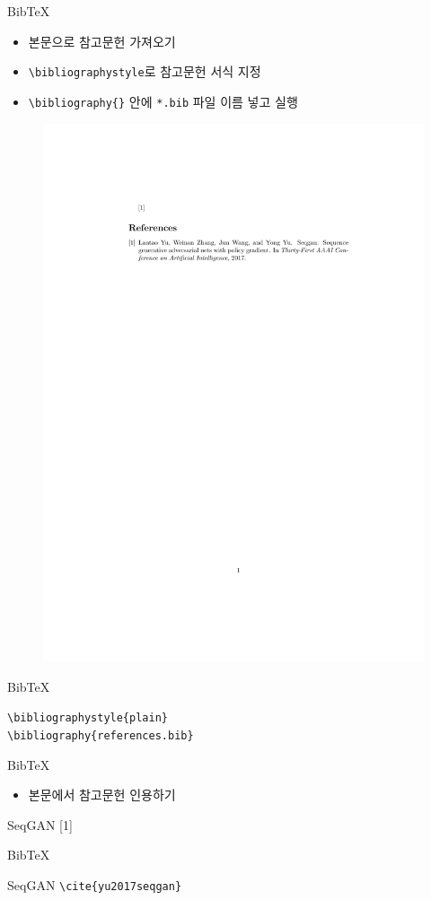 \documentclass[12pt]{gshs_lecture}
\newcommand{\tb}{\textbackslash}
\newenvironment{codeblock}[1]{
	\begin{block}{#1}
		\setstretch{1.0}
		\begin{small}
}{
		\end{small}
	\end{block}
}
\begin{document}
\begin{frame}[t]{BibTeX}
	\begin{itemize}
		\item 본문으로 참고문헌 가져오기
		\item \texttt{\tb bibliographystyle}로 참고문헌 서식 지정
		\item \texttt{\tb bibliography\{\}} 안에 \texttt{*.bib} 파일 이름 넣고 실행
	\end{itemize}
	\begin{figure}
		\centering
		\includegraphics[width=.7\textwidth, clip, trim = 4cm 22cm 4cm 5cm]{ref.pdf}
	\end{figure}
	\begin{codeblock}{BibTeX}
		\texttt{\tb bibliographystyle\{plain\} \\
		\tb bibliography\{references.bib\}}
	\end{codeblock}
\end{frame}

\begin{frame}[t]{BibTeX}
	\begin{itemize}
		\item 본문에서 참고문헌 인용하기
	\end{itemize}
	
	SeqGAN [1]
	
	\begin{codeblock}{BibTeX}
		SeqGAN \texttt{\tb cite\{yu2017seqgan\} }
	\end{codeblock}
\end{frame}
\end{document}
